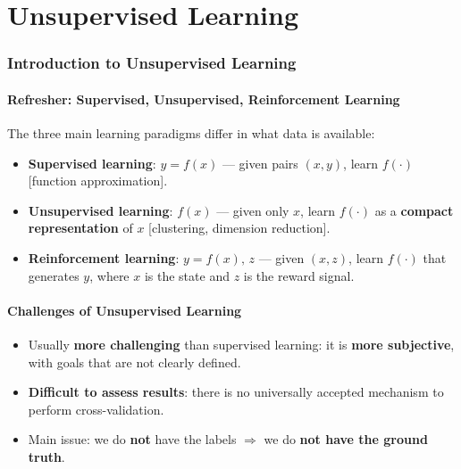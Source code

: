 \documentclass[11pt,a4paper]{article}
\theoremstyle{definition}
\theoremstyle{plain}
\theoremstyle{remark}
\begin{document}
\part{Unsupervised Learning}

\section{Introduction to Unsupervised Learning}

\subsection{Refresher: Supervised, Unsupervised, Reinforcement Learning}

The three main learning paradigms differ in what data is available:
\begin{itemize}
    \item \textbf{Supervised learning}: $y = f(x)$ — given pairs $(x, y)$, learn $f(\cdot)$ [function approximation].
    \item \textbf{Unsupervised learning}: $f(x)$ — given only $x$, learn $f(\cdot)$ as a \textbf{compact representation} of $x$ [clustering, dimension reduction].
    \item \textbf{Reinforcement learning}: $y = f(x),\, z$ — given $(x, z)$, learn $f(\cdot)$ that generates $y$, where $x$ is the state and $z$ is the reward signal.
\end{itemize}

\subsection{Challenges of Unsupervised Learning}

\begin{tcolorbox}[colback=orange!5!white,colframe=orange!75!black,title=\textbf{Why Unsupervised is Hard}]
\begin{itemize}
    \item Usually \textbf{more challenging} than supervised learning: it is \textbf{more subjective}, with goals that are not clearly defined.
    \item \textbf{Difficult to assess results}: there is no universally accepted mechanism to perform cross-validation.
    \item Main issue: we do \textbf{not} have the labels $\Rightarrow$ we do \textbf{not have the ground truth}.
\end{itemize}
\end{tcolorbox}
\end{document}
